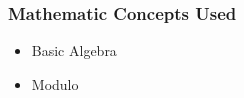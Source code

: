 {\begin{highlight}[\CSPBIntro]
        \subsubsection*{Mathematic Concepts Used}
    
        \begin{itemize}
            \item Basic Algebra
            \item Modulo
        \end{itemize}
    \end{highlight}
}